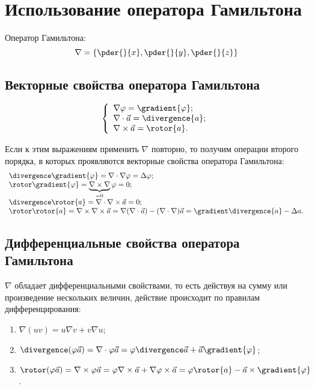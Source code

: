 \section{Использование оператора Гамильтона}

	Оператор Гамильтона:
	\[ \nabla = \left\{ \pder{}{x}, \pder{}{y}, \pder{}{z} \right\} \]

\subsection{Векторные свойства оператора Гамильтона}

	\[ \left\{ \begin{array}{l}
		\nabla\varphi = \gradient{\varphi}; \\
		\nabla\cdot\vec{a} = \divergence{a}; \\
		\nabla\times\vec{a} = \rotor{a}.
	\end{array} \right. \]
	
	Если к этим выражениям применить \( \nabla \) повторно, то получим операции второго порядка, в которых проявляются векторные свойства оператора Гамильтона:
	\[ \begin{array}{l}
		\divergence\gradient{\varphi} = \nabla\cdot\nabla\varphi = \Delta\varphi; \\
		\rotor\gradient{\varphi} = \underbrace{\nabla\times\nabla}_{ = 0}\varphi = 0; \\
		\divergence\rotor{a} = \nabla\cdot\nabla\times\vec{a} = 0; \\
		\rotor\rotor{a} = \nabla\times\nabla\times\vec{a} = \nabla(\nabla\cdot\vec{a}) - (\nabla\cdot\nabla)\vec{a} = \gradient\divergence{a} - \Delta{a}.
	\end{array} \]

\subsection{Дифференциальные свойства оператора Гамильтона}

	\( \nabla \) обладает дифференциальными свойствами, то есть действуя на сумму или произведение нескольких величин, действие происходит по правилам дифференцирования:
	\begin{enumerate}
	\item \( \nabla(uv) = u\nabla v + v\nabla u \);
	\item \( \divergence(\varphi\vec{a}) = \nabla\cdot\varphi\vec{a} = \varphi\divergence\vec{a} + \vec{a}\gradient{\varphi} \);
	\item \( \rotor(\varphi\vec{a}) = \nabla\times\varphi\vec{a} = \varphi\nabla\times\vec{a} + \nabla\varphi\times\vec{a} = \varphi\rotor{a} - \vec{a}\times\gradient{\varphi} \).
	\end{enumerate}
	
